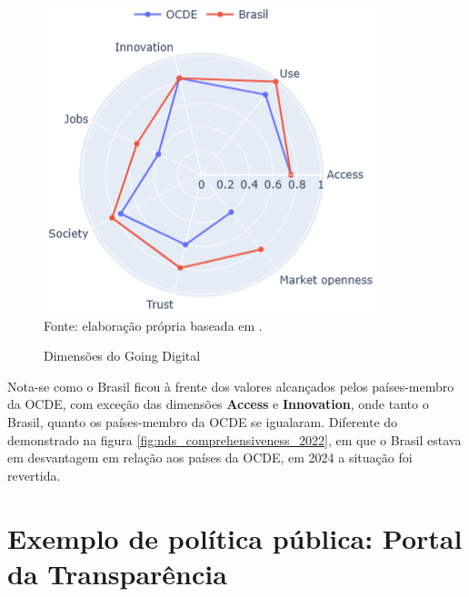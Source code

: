 \begin{figure}[H]
	\centering
	\caption{Dimensões do Going Digital}
	\includegraphics[width=0.75\linewidth]{figuras/digital_economic_outlook_2024_brasil_ocde}
	\label{fig:digital_economic_outlook_2024_brasil_ocde}
	\\ \footnotesize{Fonte: elaboração própria baseada em \cite{digital_economy_outlook_v2_2024}.}
\end{figure}

Nota-se como o Brasil ficou à frente dos valores alcançados pelos países-membro da OCDE, com exceção das dimensões \textbf{Access} e \textbf{Innovation}, onde tanto o Brasil, quanto os países-membro da OCDE se igualaram. Diferente do demonstrado na figura \ref{fig:nds_comprehensiveness_2022}, em que o Brasil estava em desvantagem em relação aos países da OCDE, em 2024 a situação foi revertida.

\section{Exemplo de política pública: Portal da Transparência}

